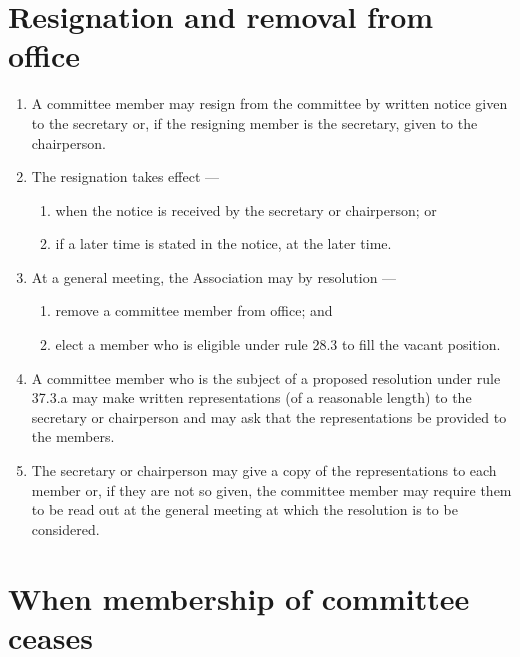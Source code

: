 \hypertarget{resignation-and-removal-from-office}{%
\section{Resignation and removal from office}\label{resignation-and-removal-from-office}}

\begin{enumerate}

\item A committee member may resign from the committee by written notice given to the secretary or, if the resigning member is the secretary, given to the chairperson.
\item The resignation takes effect ---

  \begin{enumerate}
  
  \item when the notice is received by the secretary or chairperson; or
  \item if a later time is stated in the notice, at the later time.
  \end{enumerate}
\item At a general meeting, the Association may by resolution ---

  \begin{enumerate}
  
  \item remove a committee member from office; and
  \item elect a member who is eligible under rule 28.3 to fill the vacant position.
  \end{enumerate}
\item A committee member who is the subject of a proposed resolution under rule 37.3.a may make written representations (of a reasonable length) to the secretary or chairperson and may ask that the representations be provided to the members.
\item The secretary or chairperson may give a copy of the representations to each member or, if they are not so given, the committee member may require them to be read out at the general meeting at which the resolution is to be considered.
\end{enumerate}

\hypertarget{when-membership-of-committee-ceases}{%
\section{When membership of committee ceases}\label{when-membership-of-committee-ceases}}

